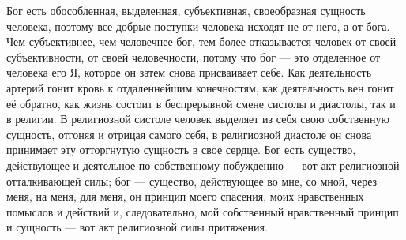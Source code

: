 \documentclass[12pt,oneside]{book}
\begin{document}
Бог есть обособленная, выделенная, субъективная, своеобразная сущность человека, поэтому все добрые поступки человека исходят не от него, а от бога. Чем субъективнее, чем человечнее бог, тем более отказывается человек от своей субъективности, от своей человечности, потому что бог --- это отделенное от человека его Я, которое он затем снова присваивает себе. Как деятельность артерий гонит кровь к отдаленнейшим конечностям, как деятельность вен гонит её обратно, как жизнь состоит в беспрерывной смене систолы и диастолы, так и в религии. В религиозной систоле человек выделяет из себя свою собственную сущность, отгоняя и отрицая самого себя, в религиозной диастоле он снова принимает эту отторгнутую сущность в свое сердце. Бог есть существо, действующее и деятельное по собственному побуждению --- вот акт религиозной отталкивающей силы; бог --- существо, действующее во мне, со мной, через меня, на меня, для меня, он принцип моего спасения, моих нравственных помыслов и действий и, следовательно, мой собственный нравственный принцип и сущность --- вот акт религиозной силы притяжения.
\end{document}
